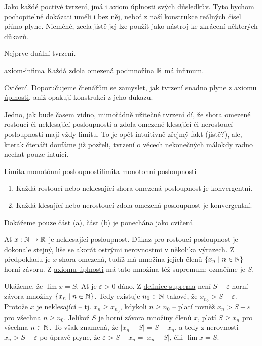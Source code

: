 Jako každé poctivé tvrzení, jmá i \hyperref[prop:axiom-uplnosti]{axiom úplnosti}
svých důsledkův. Tyto bychom pochopitelně dokázati uměli i bez něj, neboť z naší
konstrukce reálných čísel přímo plyne. Nicméně, zcela jistě jej lze použít
jako nástroj ke zkrácení některých důkazů.

Nejprve duální tvrzení.

\begin{proposition}{}{axiom-infima}
 Každá zdola omezená podmnožina $\mathbb{R}$ má infimum.
\end{proposition}
\begin{propproof}
 Cvičení. Doporučujeme čtenářům se zamyslet, jak tvrzení snadno plyne z
 \hyperref[prop:axiom-uplnosti]{axiomu úplnosti}, aniž opakují konstrukci z jeho
 důkazu.
\end{propproof}

Jedno, jak bude časem vidno, mimořádně užitečné tvrzení dí, že shora omezené
rostoucí či neklesající posloupnosti a zdola omezené klesající či nerostoucí
posloupnosti mají vždy limitu. To je opět intuitivně zřejmý fakt (jistě?), ale,
kterak čtenáři doufáme již pozřeli, tvrzení o věcech nekonečných málokdy radno
nechat pouze intuici.

\begin{lemma}{Limita monotónní posloupnosti}{limita-monotonni-posloupnosti}
 \vspace*{-\parskip}
 \begin{enumerate}[label=(\alph*)]
  \item Každá rostoucí nebo neklesající shora omezená posloupnost je
   konvergentní.
  \item Každá klesající nebo nerostoucí zdola omezená posloupnost je
   konvergentní.
 \end{enumerate}
\end{lemma}
\begin{lemproof}
 Dokážeme pouze část (a), část (b) je ponechána jako cvičení.

 Ať $x:\mathbb{N} \to \mathbb{R}$ je neklesající posloupnost. Důkaz pro rostoucí posloupnost je
 dokonale stejný, liše se akorát ostrými nerovnostmi v několika výrazech. Z
 předpokladu je $x$ shora omezená, tudíž má množina jejích členů $\{x_n \mid n
 \in \mathbb{N}\}$ horní závoru. Z \hyperref[prop:axiom-uplnosti]{axiomu úplnosti} má
 tato množina též supremum; označíme je $S$.

 Ukážeme, že $\lim x = S$. Ať je $\varepsilon>0$ dáno. Z
 \hyperref[def:supremum-a-infimum]{definice suprema} není $S - \varepsilon$
 horní závora množiny $\{x_n \mid n \in \mathbb{N}\}$. Tedy existuje $n_0 \in \mathbb{N}$
 takové, že $x_{n_0} > S - \varepsilon$. Protože $x$ je neklesající -- tj. $x_n
 \geq x_{n_0}$, kdykoli $n \geq n_0$ -- platí rovněž $x_n > S - \varepsilon$ pro
 všechna $n \geq n_0$. Jelikož $S$ je horní závora množiny členů $x$, platí $S
\geq x_n$ pro všechna $n \in \mathbb{N}$. To však znamená, že $|x_n - S| = S - x_n$, a
tedy z nerovnosti $x_n > S - \varepsilon$ po úpravě plyne, že $\varepsilon > S -
x_n = |x_n - S|$, čili $\lim x = S$.
\end{lemproof}


